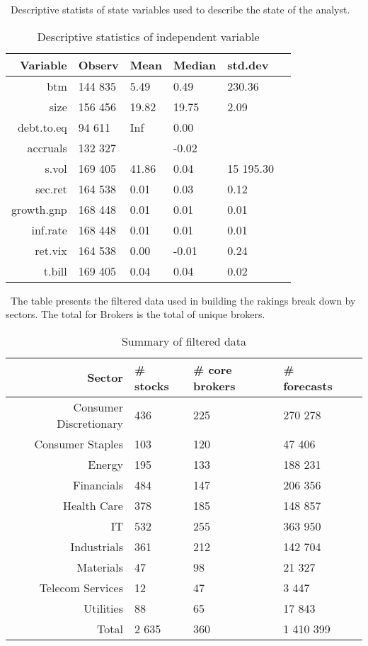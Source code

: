 \begin{table}[hp]
\caption{Descriptive statistics of independent variable}
\ Descriptive statists of state variables used to describe the state of the analyst.
\begin{center}
\begin{tabularx}{\linewidth}{r*{5}{Y}}
\toprule
Variable & Observ & Mean & Median & std.dev\\
\midrule 
 btm & 144 835 & 5.49 & 0.49 & 230.36 \\ 
  size & 156 456 & 19.82 & 19.75 & 2.09 \\ 
  debt.to.eq & 94 611 & Inf & 0.00 &  \\ 
  accruals & 132 327 &  & -0.02 &  \\ 
  s.vol & 169 405 & 41.86 & 0.04 & 15 195.30 \\ 
  sec.ret & 164 538 & 0.01 & 0.03 & 0.12 \\ 
  growth.gnp & 168 448 & 0.01 & 0.01 & 0.01 \\ 
  inf.rate & 168 448 & 0.01 & 0.01 & 0.01 \\ 
  ret.vix & 164 538 & 0.00 & -0.01 & 0.24 \\ 
  t.bill & 169 405 & 0.04 & 0.04 & 0.02 \\ 
  
\bottomrule
\end{tabularx}
\end{center}
\label{tab:ind.vvs}
\end{table}


\begin{table}[hp]
\caption{Summary of filtered data}
\ The table presents the filtered data used in building the rakings break down by sectors. The total for Brokers is the total of unique brokers.

\begin{center}
\begin{tabularx}{\linewidth}{r*{4}{Y}}
\toprule
Sector & \# stocks & \# core brokers & \# forecasts \\ 
\midrule
 Consumer Discretionary & 436 & 225 & 270 278 \\ 
  Consumer Staples & 103 & 120 & 47 406 \\ 
  Energy & 195 & 133 & 188 231 \\ 
  Financials & 484 & 147 & 206 356 \\ 
  Health Care & 378 & 185 & 148 857 \\ 
  IT & 532 & 255 & 363 950 \\ 
  Industrials & 361 & 212 & 142 704 \\ 
  Materials &  47 &  98 & 21 327 \\ 
  Telecom Services &  12 &  47 & 3 447 \\ 
  Utilities &  88 &  65 & 17 843 \\ 
   \midrule 
Total & 2 635 & 360 & 1 410 399 \\ 
  
\bottomrule
\end{tabularx}
\label{table:filtered.summary}
\end{center}
\end{table}

